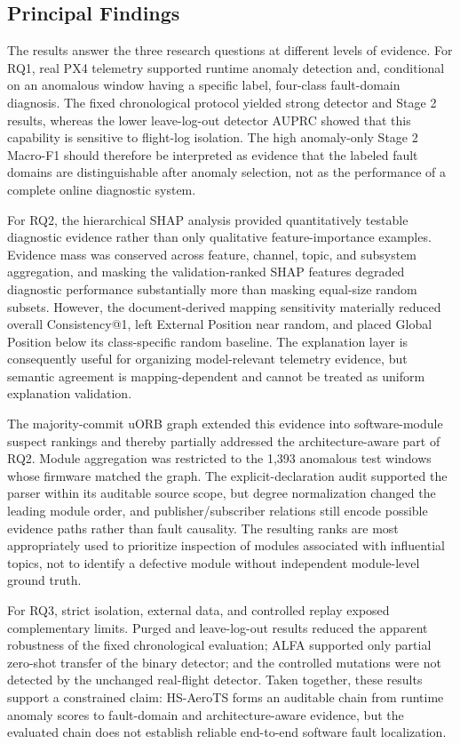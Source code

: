 \subsection{Principal Findings}

The results answer the three research questions at different levels of evidence. For RQ1, real PX4 telemetry supported runtime anomaly detection and, conditional on an anomalous window having a specific label, four-class fault-domain diagnosis. The fixed chronological protocol yielded strong detector and Stage 2 results, whereas the lower leave-log-out detector AUPRC showed that this capability is sensitive to flight-log isolation. The high anomaly-only Stage 2 Macro-F1 should therefore be interpreted as evidence that the labeled fault domains are distinguishable after anomaly selection, not as the performance of a complete online diagnostic system.

For RQ2, the hierarchical SHAP analysis provided quantitatively testable diagnostic evidence rather than only qualitative feature-importance examples. Evidence mass was conserved across feature, channel, topic, and subsystem aggregation, and masking the validation-ranked SHAP features degraded diagnostic performance substantially more than masking equal-size random subsets. However, the document-derived mapping sensitivity materially reduced overall Consistency@1, left External Position near random, and placed Global Position below its class-specific random baseline. The explanation layer is consequently useful for organizing model-relevant telemetry evidence, but semantic agreement is mapping-dependent and cannot be treated as uniform explanation validation.

The majority-commit uORB graph extended this evidence into software-module suspect rankings and thereby partially addressed the architecture-aware part of RQ2. Module aggregation was restricted to the 1,393 anomalous test windows whose firmware matched the graph. The explicit-declaration audit supported the parser within its auditable source scope, but degree normalization changed the leading module order, and publisher/subscriber relations still encode possible evidence paths rather than fault causality. The resulting ranks are most appropriately used to prioritize inspection of modules associated with influential topics, not to identify a defective module without independent module-level ground truth.

For RQ3, strict isolation, external data, and controlled replay exposed complementary limits. Purged and leave-log-out results reduced the apparent robustness of the fixed chronological evaluation; ALFA supported only partial zero-shot transfer of the binary detector; and the controlled mutations were not detected by the unchanged real-flight detector. Taken together, these results support a constrained claim: HS-AeroTS forms an auditable chain from runtime anomaly scores to fault-domain and architecture-aware evidence, but the evaluated chain does not establish reliable end-to-end software fault localization.
